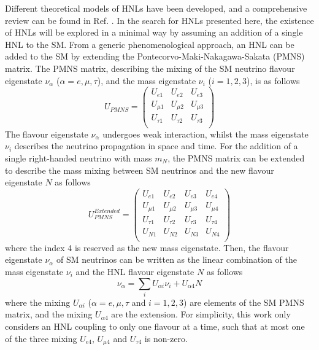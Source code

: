 Different theoretical models of HNLs have been developed, and a comprehensive review can be found in Ref. \cite{HNLWhitePaper}. 
In the search for HNLs presented here, the existence of HNLs will be explored in a minimal way by assuming an addition of a single HNL to the SM.  
From a generic phenomenological approach, an HNL can be added to the SM by extending the Pontecorvo-Maki-Nakagawa-Sakata (PMNS) matrix.
The PMNS matrix, describing the mixing of the SM neutrino flavour eigenstate $\nu_{\alpha}$ ($\alpha=e,\mu,\tau$), and the mass eigenstate $\nu_{i}$ ($i=1,2,3$), is as follows 
\begin{equation}
	U_{PMNS} =
	\begin{pmatrix}
		U_{e1} & U_{e2} & U_{e3}\\
		U_{\mu1} & U_{\mu2} & U_{\mu3}\\
		U_{\tau1} & U_{\tau2} & U_{\tau3}\\
	\end{pmatrix}
\end{equation}
The flavour eigenstate $\nu_{\alpha}$ undergoes weak interaction, whilst the mass eigenstate $\nu_{i}$ describes the neutrino propagation in space and time.
For the addition of a single right-handed neutrino with mass $m_{N}$, the PMNS matrix can be extended to describe the mass mixing between SM neutrinos and the new flavour eigenstate $N$ as follows 
\begin{equation}
	U_{PMNS}^{Extended} =
	\begin{pmatrix}
		U_{e1} & U_{e2} & U_{e3} & U_{e4}\\
		U_{\mu1} & U_{\mu2} & U_{\mu3} & U_{\mu4}\\
		U_{\tau1} & U_{\tau2} & U_{\tau3} & U_{\tau4}\\
		U_{N1} & U_{N2} & U_{N3} & U_{N4}\\
	\end{pmatrix}
\end{equation}
where the index 4 is reserved as the new mass eigenstate.
Then, the flavour eigenstate  $\nu_{\alpha}$ of SM neutrinos can be written as the linear combination of the mass eigenstate $\nu_{i}$ and the HNL flavour eigenstate $N$ as follows 
\begin{equation}
	\nu_{\alpha}=\sum_i U_{\alpha i}\nu_{i} + U_{\alpha 4}N
\end{equation}
where the mixing $U_{\alpha i }$ ($\alpha=e,\mu,\tau$ and $i=1,2,3$) are elements of the SM PMNS matrix, and the mixing $U_{\alpha 4}$ are the extension.
For simplicity, this work only considers an HNL coupling to only one flavour at a time, such that at most one of the three mixing $U_{e4}$, $U_{\mu4}$ and $U_{\tau4}$ is non-zero.

